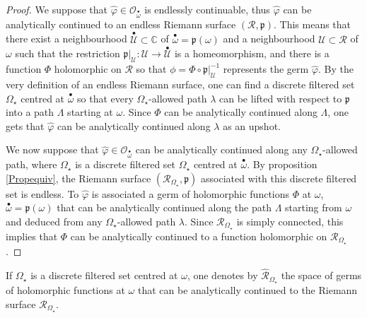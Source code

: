 \documentclass[11pt, english]{smfart}
\theoremstyle{definition}
\begin{document}
\begin{proof}
We suppose that $\widehat{\varphi} \in \mathcal{O}_{ {\stackrel{\bullet}{\omega}} }$ is
endlessly continuable, thus $\widehat{\varphi}$ can be analytically
continued to an endless Riemann surface $(\mathscr{R},
\mathfrak{p})$. This means that there exist  a neighbourhood
$\stackrel{\bullet}{\mathscr{U}} \subset \mathbb{C}$ 
of ${ {\stackrel{\bullet}{\omega}} } = \mathfrak{p}(\omega)$ and a neighbourhood
 $\mathscr{U} \subset \mathscr{R}$ of $\omega$ such that 
the restriction $\mathfrak{p}|_{\mathscr{U}} : \mathscr{U} \to
\stackrel{\bullet}{\mathscr{U}}$ is a homeomorphism, and there is a function 
$\Phi$ holomorphic on $\mathscr{R}$ so that $\phi = \Phi \circ
\mathfrak{p}|_{\mathscr{U}}^{-1}$ represents the germ
$\widehat{\varphi}$. By the very definition of an endless Riemann
surface, one can find a discrete  filtered set $\Omega_\star$ centred
at ${ {\stackrel{\bullet}{\omega}} }$ so that every $\Omega_\star$-allowed path 
$\lambda$ can be lifted with respect to $\mathfrak{p}$ into a path
$\Lambda$ starting at $\omega$. Since $\Phi$ can be analytically
continued along $\Lambda$, one gets that $\widehat{\varphi}$ can be
analytically continued along $\lambda$ as an upshot.

We now suppose that $\widehat{\varphi} \in \mathcal{O}_{ {\stackrel{\bullet}{\omega}} }$
can be analytically continued along any $\Omega_\star$-allowed path,
where $\Omega_\star$ is a discrete  filtered set $\Omega_\star$ centred
at ${ {\stackrel{\bullet}{\omega}} }$. By proposition \ref{Propequiv}, the Riemann surface
 $(\mathscr{R}_{\Omega_\star}, \mathfrak{p})$ associated with this
 discrete  filtered set is endless. To $\widehat{\varphi}$ is
 associated a germ of holomorphic functions $\Phi$ at $\omega$,
 ${ {\stackrel{\bullet}{\omega}} } = \mathfrak{p}(\omega)$ that can be analytically continued
 along the path $\Lambda$ starting from $\omega$ and deduced from any 
  $\Omega_\star$-allowed path $\lambda$. Since
 $\mathscr{R}_{\Omega_\star}$ is simply connected, this implies that
 $\Phi$ can be analytically continued to a function holomorphic on 
$\mathscr{R}_{\Omega_\star}$.
\end{proof}

\begin{defi}\label{defendlesscont-bis}
If $\Omega_\star$ is  a discrete filtered set centred at $\omega$, one
denotes by $\hat{\mathscr{R}}_{\Omega_\star}$ the space of germs of
holomorphic functions  at $\omega$ that can be analytically continued
to the Riemann surface ${\mathscr{R}}_{\Omega_\star}$.
\end{defi}
\end{document}
